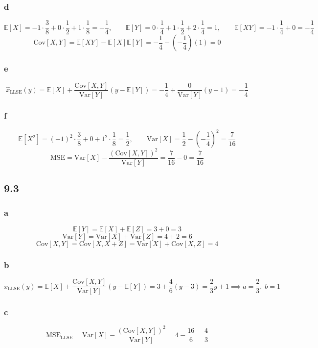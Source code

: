 \documentclass{article}
\newcommand{\E}[1]{\mathbb{E}\!\left[#1\right]}
\newcommand{\Var}[1]{\mathrm{Var}\!\left[#1\right]}
\newcommand{\Cov}[2]{\mathrm{Cov}\!\left[#1,#2\right]}
\begin{document}
\subsubsection*{d}
\[
\E{X} = -1\cdot\frac{3}{8} + 0\cdot\frac{1}{2} + 1\cdot\frac{1}{8} = -\frac{1}{4},\qquad
\E{Y} = 0\cdot\frac{1}{4} + 1\cdot\frac{1}{2} + 2\cdot\frac{1}{4} = 1,\qquad
\E{XY} = -1\cdot\frac{1}{4} + 0 = -\frac{1}{4}
\]
\[
\Cov{X}{Y} = \E{XY} - \E{X}\E{Y} = -\frac{1}{4} - \left(-\frac{1}{4}\right)(1) = 0
\]

\subsubsection*{e}
\[
\hat{x}_\text{LLSE}(y) = \E{X} + \frac{\Cov{X}{Y}}{\Var{Y}}(y - \E{Y})
= -\frac{1}{4} + \frac{0}{\Var{Y}}(y-1) = -\frac{1}{4}
\]

\subsubsection*{f}
\[
\E{X^2} = (-1)^2\cdot\frac{3}{8} + 0 + 1^2\cdot\frac{1}{8} = \frac{1}{2},\qquad
\Var{X} = \frac{1}{2} - \left(-\frac{1}{4}\right)^2 = \frac{7}{16}
\]
\[
\text{MSE} = \Var{X} - \frac{(\Cov{X}{Y})^2}{\Var{Y}} = \frac{7}{16} - 0 = \frac{7}{16}
\]

\subsection*{9.3}

\subsubsection*{a}
\[
\E{Y} = \E{X} + \E{Z} = 3 + 0 = 3
\]
\[
\Var{Y} = \Var{X} + \Var{Z} = 4 + 2 = 6
\]
\[
\Cov{X}{Y} = \Cov{X}{X+Z} = \Var{X} + \Cov{X}{Z} = 4
\]

\subsubsection*{b}
\[
\hat{x}_\text{LLSE}(y) = \E{X} + \frac{\Cov{X}{Y}}{\Var{Y}}(y - \E{Y})
= 3 + \frac{4}{6}(y-3) = \frac{2}{3}y + 1
\implies a = \frac{2}{3},\; b = 1
\]

\subsubsection*{c}
\[
\text{MSE}_\text{LLSE} = \Var{X} - \frac{(\Cov{X}{Y})^2}{\Var{Y}} = 4 - \frac{16}{6} = \frac{4}{3}
\]
\end{document}
